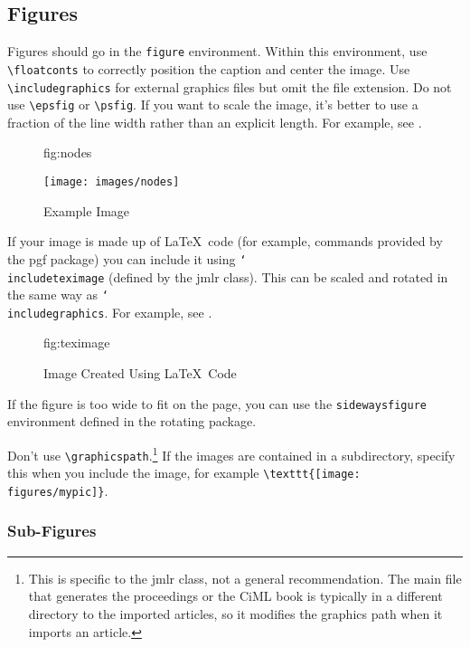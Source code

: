 \documentclass[tablecaption=bottom,wcp]{jmlr} %
\newcommand{\cs}[1]{\texttt{\char`\\#1}}%
\begin{document}
\subsection{Figures}
\label{sec:figures}

Figures should go in the \texttt{figure} environment. Within this
environment, use \verb|\floatconts| to correctly position the
caption and center the image. Use \verb|\includegraphics|
for external graphics files but omit the file extension. Do not
use \verb|\epsfig| or \verb|\psfig|. If you want to scale the
image, it's better to use a fraction of the line width rather
than an explicit length. For example, see .

\begin{figure}[htbp]
  \floatconts
  {fig:nodes}
  {\caption{Example Image}}
  {\texttt{[image: images/nodes]}}
\end{figure}

If your image is made up of \LaTeX\ code (for example, commands
provided by the \textsf{pgf} package) you can include it using
\cs{includeteximage} (defined by the \textsf{jmlr} class). This
can be scaled and rotated in the same way as \cs{includegraphics}.
For example, see .

\begin{figure}[htbp]
  \floatconts
  {fig:teximage}
  {\caption{Image Created Using \LaTeX\ Code}}
  {}
\end{figure}

If the figure is too wide to fit on the page, you can use the
\texttt{sidewaysfigure} environment defined in the
\textsf{rotating} package.

Don't use \verb|\graphicspath|.\footnote{This is specific to the
  \textsf{jmlr} class, not a general recommendation. The main file
  that generates the proceedings or the CiML book is typically in a
  different directory to the imported articles, so it modifies the
  graphics path when it imports an article.} If the images
are contained in a subdirectory, specify this when you include the image, for
example \verb|\texttt{[image: figures/mypic]}|.

\subsubsection{Sub-Figures}
\label{sec:subfigures}
\end{document}
